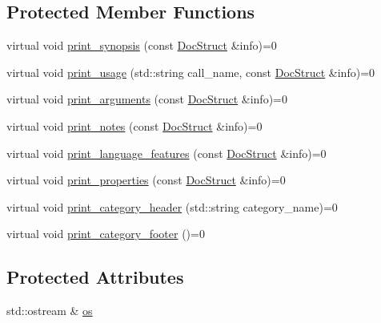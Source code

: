 \subsection*{Protected Member Functions}
\begin{DoxyCompactItemize}
\item 
virtual void \hyperlink{classDocPrinter_abb2a5b5121292d292ff682f94e187534}{print\-\_\-synopsis} (const \hyperlink{structDocStruct}{Doc\-Struct} \&info)=0
\item 
virtual void \hyperlink{classDocPrinter_aa967b483b8def39d7ba5f039bd3c4acd}{print\-\_\-usage} (std\-::string call\-\_\-name, const \hyperlink{structDocStruct}{Doc\-Struct} \&info)=0
\item 
virtual void \hyperlink{classDocPrinter_a9e8339a87ec6aa5bc11017eec937372c}{print\-\_\-arguments} (const \hyperlink{structDocStruct}{Doc\-Struct} \&info)=0
\item 
virtual void \hyperlink{classDocPrinter_ae53baee3061725f2d2e02c75c6e8a5a3}{print\-\_\-notes} (const \hyperlink{structDocStruct}{Doc\-Struct} \&info)=0
\item 
virtual void \hyperlink{classDocPrinter_aba345d8b3a03bca1aa7c2363260dfdf8}{print\-\_\-language\-\_\-features} (const \hyperlink{structDocStruct}{Doc\-Struct} \&info)=0
\item 
virtual void \hyperlink{classDocPrinter_a16854272b22ca9129f9afb9c42157736}{print\-\_\-properties} (const \hyperlink{structDocStruct}{Doc\-Struct} \&info)=0
\item 
virtual void \hyperlink{classDocPrinter_a7a8d538ac102b331f891b4cd86c814ab}{print\-\_\-category\-\_\-header} (std\-::string category\-\_\-name)=0
\item 
virtual void \hyperlink{classDocPrinter_aa96cf13e25fdd6cb854b0efb8e89046a}{print\-\_\-category\-\_\-footer} ()=0
\end{DoxyCompactItemize}
\subsection*{Protected Attributes}
\begin{DoxyCompactItemize}
\item 
std\-::ostream \& \hyperlink{classDocPrinter_a30860614cca992c360838670c209eb00}{os}
\end{DoxyCompactItemize}


